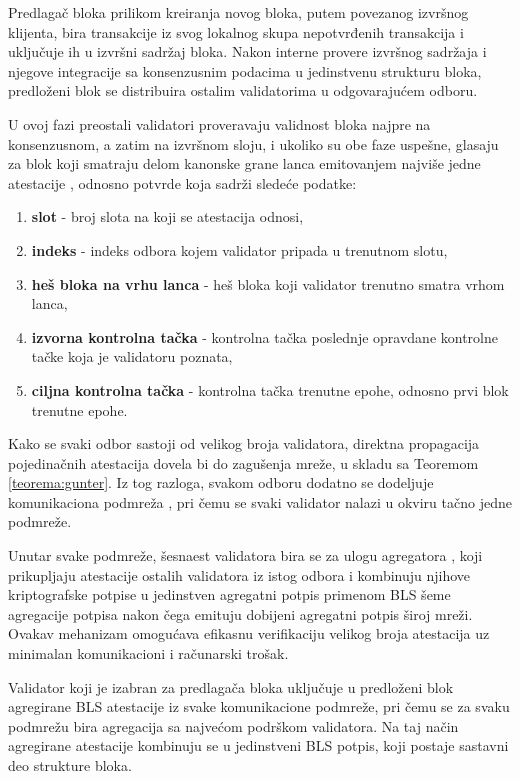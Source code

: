 Predlagač bloka prilikom kreiranja novog bloka, putem povezanog izvršnog klijenta, bira transakcije iz svog lokalnog skupa nepotvrđenih transakcija i uključuje ih u izvršni sadržaj bloka. Nakon interne provere izvršnog sadržaja i njegove integracije sa konsenzusnim podacima u jedinstvenu strukturu bloka, predloženi blok se distribuira ostalim validatorima u odgovarajućem odboru.

U ovoj fazi preostali validatori proveravaju validnost bloka najpre na konsenzusnom, a zatim na izvršnom sloju, i ukoliko su obe faze uspešne, glasaju za blok koji smatraju delom kanonske grane lanca emitovanjem najviše jedne atestacije , odnosno potvrde koja sadrži sledeće podatke:
\begin{enumerate}
\item \textbf{slot} - broj slota na koji se atestacija odnosi,
\item \textbf{indeks} - indeks odbora kojem validator pripada u trenutnom slotu,
\item \textbf{heš bloka na vrhu lanca } - heš bloka koji validator trenutno smatra vrhom lanca,
\item \textbf{izvorna kontrolna tačka } - kontrolna tačka poslednje opravdane  kontrolne tačke koja je validatoru poznata,
\item \textbf{ciljna kontrolna tačka } - kontrolna tačka trenutne epohe, odnosno prvi blok trenutne epohe.
\end{enumerate}

Kako se svaki odbor sastoji od velikog broja validatora, direktna propagacija pojedinačnih atestacija dovela bi do zagušenja mreže, u skladu sa Teoremom \ref{teorema:gunter}. Iz tog razloga, svakom odboru dodatno se dodeljuje komunikaciona podmreža , pri čemu se svaki validator nalazi u okviru tačno jedne podmreže.

Unutar svake podmreže, šesnaest validatora bira se za ulogu agregatora , koji prikupljaju atestacije ostalih validatora iz istog odbora i kombinuju njihove kriptografske potpise u jedinstven agregatni potpis primenom BLS šeme agregacije potpisa \cite{boneh2001short} nakon čega emituju dobijeni agregatni potpis široj mreži. Ovakav mehanizam omogućava efikasnu verifikaciju velikog broja atestacija uz minimalan komunikacioni i računarski trošak.

Validator koji je izabran za predlagača bloka uključuje u predloženi blok agregirane BLS atestacije iz svake komunikacione podmreže, pri čemu se za svaku podmrežu bira agregacija sa najvećom podrškom validatora. Na taj način agregirane atestacije kombinuju se u jedinstveni BLS potpis, koji postaje sastavni deo strukture bloka.

